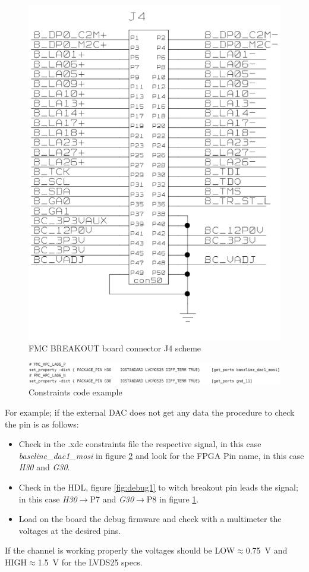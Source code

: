 \begin{figure}[H]
	\centering
	\includegraphics[width=0.35\linewidth]{IMG/ch3/DEBUG2}
	\caption{FMC BREAKOUT board connector J4 scheme}
	\label{fig:debug2}
\end{figure}\begin{figure}[H]
\centering
\includegraphics[width=0.7\linewidth]{IMG/ch3/DEBUG3}
\caption{Constraints code example}
\label{fig:debug3}
\end{figure}
\noindent For example; if the external DAC does not get any data the procedure to check the pin is as follows:
\begin{itemize}
	\item Check in the .xdc constraints file the respective signal, in this case \textit{baseline\_dac1\_mosi} in figure \ref{fig:debug3} and look for the FPGA Pin name, in this case \textit{H30} and \textit{G30}.
	\item Check in the HDL, figure \ref{fig:debug1} to witch breakout pin leads the signal; in this case \textit{H30}$\rightarrow$P7 and \textit{G30}$\rightarrow$P8 in figure \ref{fig:debug2}.
	\item Load on the board the debug firmware and check with a multimeter the voltages at the desired pins.    
\end{itemize}
\noindent If the channel is working properly the voltages should be LOW$\approx$0.75~V and HIGH$\approx$1.5~V for the LVDS25 specs.  

































